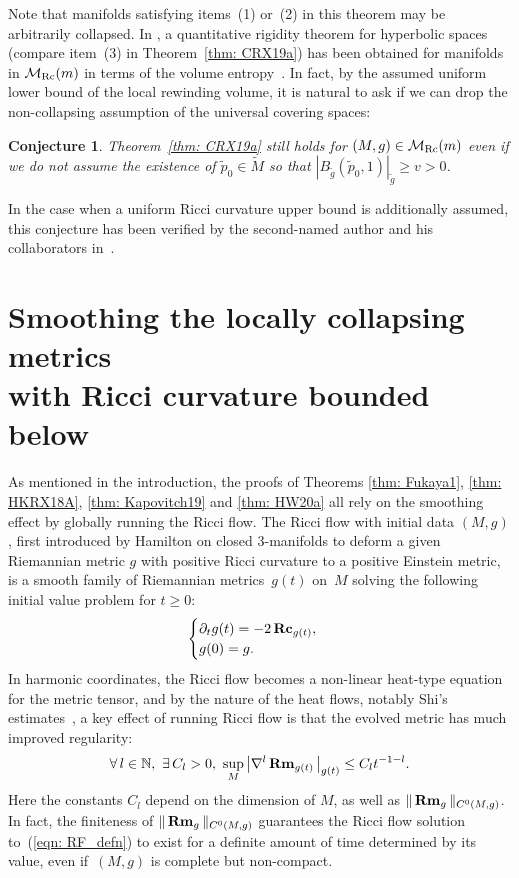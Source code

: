 \documentclass[pdftex]{sigma}
\numberwithin{equation}{section}
\newtheorem{Conjecture}[Theorem]{Conjecture}
\newcommand{\Rm}{\operatorname{\bf Rm}}
\newcommand{\Rc}{\operatorname{\bf Rc}}
\begin{document}
Note that manifolds satisfying items~(1) or~(2) in this theorem may be
arbitrarily collapsed. In \cite[Theorem~D]{CRX19}, a quantitative rigidity
theorem for hyperbolic spaces (compare item~(3) in Theorem~\ref{thm: CRX19a})
has been obtained for manifolds in $\mathcal{M}_{\rm Rc}(m)$ in terms of the volume
entropy~\cite{LW10}. In fact, by the assumed uniform lower bound of the local
rewinding volume, it is natural to ask if we can drop the non-collapsing
assumption of the universal covering spaces:
\begin{Conjecture}
Theorem~{\rm \ref{thm: CRX19a}} still holds for $(M,g)\in \mathcal{M}_{\rm Rc}(m)$ even if
we do not assume the existence of $\tilde{p}_0\in \tilde{M}$ so that
$|B_{\tilde{g}} (\tilde{p}_0,1)|_{\tilde{g}}\ge v>0$.
\end{Conjecture}
In the case when a uniform Ricci curvature upper bound is additionally assumed,
this conjecture has been verified by the second-named author and his
collaborators in~\cite{CRX18}.

\section[Smoothing the locally collapsing metrics with Ricci curvature bounded
below]{Smoothing the locally collapsing metrics\\ with Ricci curvature bounded
below}\label{section4}

As mentioned in the introduction, the proofs of Theorems \ref{thm: Fukaya1},
\ref{thm: HKRX18A}, \ref{thm: Kapovitch19} and \ref{thm: HW20a} all rely on the
smoothing effect by globally running the Ricci flow. The Ricci flow with
initial data $(M,g)$, first introduced by Hamilton \cite{Hamilton} on closed
$3$-manifolds to deform a given Riemannian metric $g$ with positive Ricci
curvature to a positive Einstein metric, is a smooth family of Riemannian
metrics~$g(t)$ on~$M$ solving the following initial value problem for $t\ge 0$:
\begin{align}\label{eqn: RF_defn}
\begin{cases}
\partial_tg(t) = -2\Rc_{g(t)},\\
g(0) = g.
\end{cases}
\end{align}
In harmonic coordinates, the Ricci flow becomes a non-linear
heat-type equation for the metric tensor, and by the nature of the heat flows,
notably Shi's estimates~\cite{Shi}, a key effect of running Ricci flow is that
the evolved metric has much improved regularity:
\begin{align}\label{eqn: Shi_estimate}
\forall\, l\in \mathbb{N},\ \exists\, C_l>0,\ \sup_M\big|\nabla^l
\Rm_{g(t)}\big|_{g(t)} \le C_lt^{-1-l}.
\end{align}
Here the constants $C_l$ depend on the dimension of $M$, as well as
$\|\Rm_g\|_{C^0(M,g)}$. In fact, the finiteness of
$\|\Rm_g\|_{C^0(M,g)}$ guarantees the Ricci flow solution to~(\ref{eqn: RF_defn}) to exist for a definite amount of time determined by
its value, even if~$(M,g)$ is complete but non-compact.
\end{document}
